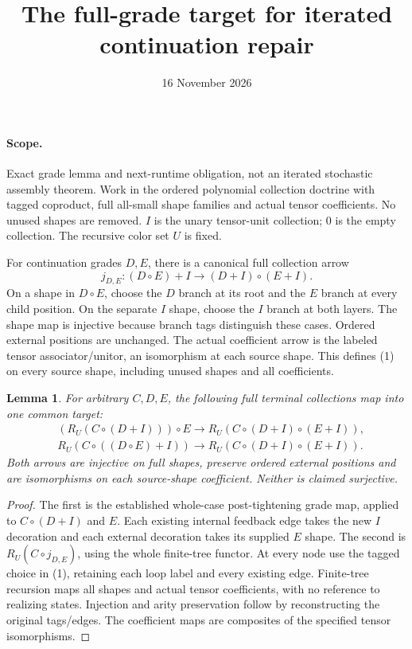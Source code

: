 \documentclass[11pt]{article}\usepackage{amsmath,amssymb,amsthm,geometry}\geometry{margin=1in}
\title{The full-grade target for iterated continuation repair}\date{16 November 2026}
\newtheorem{lemma}{Lemma}
\begin{document}
\maketitle
\paragraph{Scope.} Exact grade lemma and next-runtime obligation, not an iterated stochastic assembly theorem. Work in the ordered polynomial collection doctrine with tagged coproduct, full all-small shape families and actual tensor coefficients. No unused shapes are removed. $I$ is the unary tensor-unit collection; $0$ is the empty collection. The recursive color set $U$ is fixed.

For continuation grades $D,E$, there is a canonical full collection arrow
\[
 j_{D,E}:(D\circ E)+I\longrightarrow(D+I)\circ(E+I).       \tag{1}
\]
On a shape in $D\circ E$, choose the $D$ branch at its root and the $E$ branch at every child position. On the separate $I$ shape, choose the $I$ branch at both layers. The shape map is injective because branch tags distinguish these cases. Ordered external positions are unchanged. The actual coefficient arrow is the labeled tensor associator/unitor, an isomorphism at each source shape. This defines (1) on every source shape, including unused shapes and all coefficients.

\begin{lemma}
For arbitrary $C,D,E$, the following full terminal collections map into one common target:
\[
\begin{split}
 &(R_U(C\circ(D+I)))\circ E
       \longrightarrow R_U(C\circ(D+I)\circ(E+I)),\\
 &R_U(C\circ((D\circ E)+I))
       \longrightarrow R_U(C\circ(D+I)\circ(E+I)).       \tag{2}
\end{split}
\]
Both arrows are injective on full shapes, preserve ordered external positions and are isomorphisms on each source-shape coefficient. Neither is claimed surjective.
\end{lemma}
\begin{proof}
The first is the established whole-case post-tightening grade map, applied to $C\circ(D+I)$ and $E$. Each existing internal feedback edge takes the new $I$ decoration and each external decoration takes its supplied $E$ shape. The second is $R_U(C\circ j_{D,E})$, using the whole finite-tree functor. At every node use the tagged choice in (1), retaining each loop label and every existing edge. Finite-tree recursion maps all shapes and actual tensor coefficients, with no reference to realizing states. Injection and arity preservation follow by reconstructing the original tags/edges. The coefficient maps are composites of the specified tensor isomorphisms.
\end{proof}
\end{document}

